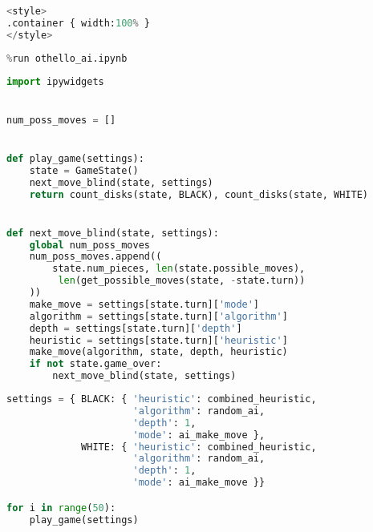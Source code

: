 \begin{lstlisting}[language=Python]
%%HTML
<style>
.container { width:100% }
</style>
\end{lstlisting}

\begin{lstlisting}[language=Python]
%run othello_game.ipynb
%run othello_ai.ipynb
\end{lstlisting}

\begin{lstlisting}[language=Python]
import ipywidgets


num_poss_moves = []


def play_game(settings):
    state = GameState()
    next_move_blind(state, settings)
    return count_disks(state, BLACK), count_disks(state, WHITE)


def next_move_blind(state, settings):
    global num_poss_moves
    num_poss_moves.append((
        state.num_pieces, len(state.possible_moves),
         len(get_possible_moves(state, -state.turn))
    ))
    make_move = settings[state.turn]['mode']
    algorithm = settings[state.turn]['algorithm']
    depth = settings[state.turn]['depth']
    heuristic = settings[state.turn]['heuristic']
    make_move(algorithm, state, depth, heuristic)
    if not state.game_over:
        next_move_blind(state, settings)
\end{lstlisting}

\begin{lstlisting}[language=Python]
settings = { BLACK: { 'heuristic': combined_heuristic,
                      'algorithm': random_ai,
                      'depth': 1,
                      'mode': ai_make_move },
             WHITE: { 'heuristic': combined_heuristic,
                      'algorithm': random_ai,
                      'depth': 1,
                      'mode': ai_make_move }}

for i in range(50):
    play_game(settings)
\end{lstlisting}

